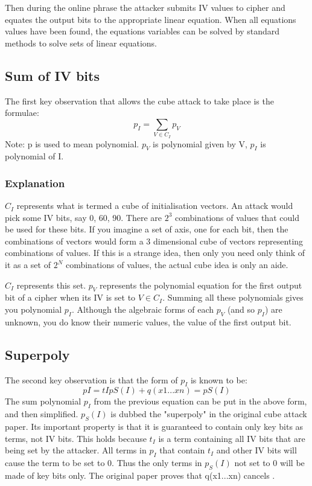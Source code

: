 \documentclass{report}
\begin{document}
Then during the online phrase the attacker submits IV values to cipher and equates the output bits to the appropriate linear equation. When all equations values have been found, the equations variables can be solved by standard methods to solve sets of linear equations.
\subsection{Sum of IV bits}
The first key observation that allows the cube attack to take place is the formulae:
\begin{equation} \label{eq:superpoly}
p_I = \sum\limits_{V \in C_I} p_V 
\end{equation}
Note: p is used to mean polynomial. $p_V$ is polynomial given by V, $p_I$ is polynomial of I.
\subsubsection{Explanation}
$C_I$ represents what is termed a cube of initialisation vectors. An attack would pick some IV bits, say 0, 60, 90. There are $2^3$ combinations of values that could be used for these bits. If you imagine a set of axis, one for each bit, then the combinations of vectors would form a 3 dimensional cube of vectors representing combinations of values. If this is a strange idea, then only you need only think of it as a set of $2^N$ combinations of values, the actual cube idea is only an aide.

$C_I$ represents this set. $p_V$ represents the polynomial equation for the first output bit of a cipher when its IV is set to $V \in C_I$. Summing all these polynomials gives you polynomial $p_I$. Although the algebraic forms of each $p_V$ (and so $p_I$) are unknown, you do know their numeric values, the value of the first output bit.
\subsection{Superpoly}
The second key observation is that the form of $p_I$ is known to be:
\begin{equation} \label{eq:GFpowers}
pI = tIpS(I)+q(x1...xn)=pS(I)
\end{equation}
The sum polynomial $p_I$ from the previous equation can be put in the above form, and then simplified.
$p_S(I)$ is dubbed the "superpoly" in the original cube attack paper. Its important property is that it is guaranteed to contain only key bits as terms, not IV bits. This holds because $t_I$ is a term containing all IV bits that are being set by the attacker. All terms in $p_I$ that contain $t_I$ and other IV bits will cause the term to be set to 0. Thus the only terms in $p_S(I)$ not set to 0 will be made of key bits only. The original paper proves that q(x1...xn) cancels \cite{DinurShamir2009}.
\end{document}
